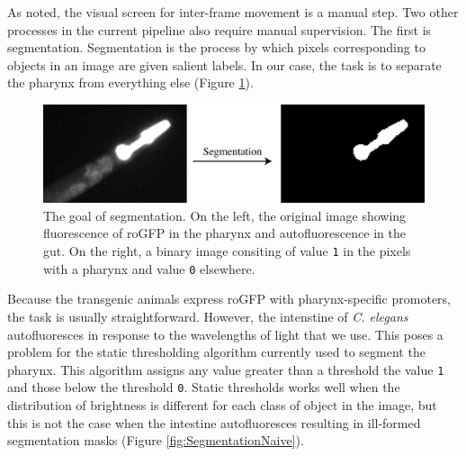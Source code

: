 As noted, the visual screen for inter-frame movement is a manual step. Two other processes in the current pipeline also require manual supervision. The first is segmentation. Segmentation is the process by which pixels corresponding to objects in an image are given salient labels. In our case, the task is to separate the pharynx from everything else (Figure \ref{fig:SegmentationExample}). 

\begin{figure}[ht]
    \centering
    \includegraphics[scale=.25]{Figures/rendered_files/segmentation_description}
    \decoRule
    \caption[The goal of segmentation]{The goal of segmentation. On the left, the original image showing fluorescence of roGFP in the pharynx and autofluorescence in the gut. On the right, a binary image consiting of value \texttt{1} in the pixels with a pharynx and value \texttt{0} elsewhere.}
    \label{fig:SegmentationExample}
\end{figure}

Because the transgenic animals express roGFP with pharynx-specific promoters, the task is usually straightforward. However, the intenstine of \textit{C. elegans} autofluoresces in response to the wavelengths of light that we use. This poses a problem for the static thresholding algorithm currently used to segment the pharynx. This algorithm assigns any value greater than a threshold the value \texttt{1} and those below the threshold \texttt{0}. Static thresholds works well when the distribution of brightness is different for each class of object in the image, but this is not the case when the intestine autofluoresces resulting in ill-formed segmentation masks (Figure \ref{fig:SegmentationNaive}).

